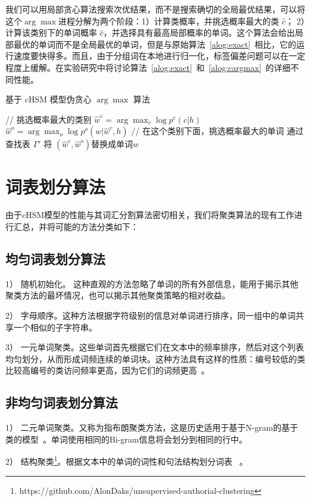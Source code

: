 我们可以用局部贪心算法搜索次优结果，而不是搜索确切的全局最优结果，可以将这个$\arg\max$进程分解为两个阶段：1）计算类概率，并挑选概率最大的类 $\hat c $； 2）计算该类别下的单词概率 $\hat c$，并选择具有最高局部概率的单词。这个算法会给出局部最优的单词而不是全局最优的单词，但是与原始算法~\ref{alog:exact}~相比，它的运行速度要快得多。而且，由于分组词在本地进行归一化，标签偏差问题可以在一定程度上缓解。在实验研究中将讨论算法~\ref{alog:exact}~和~\ref{alog:cargmax}~的详细不同性能。
\begin{algorithm}[!t]
 \caption{基于 cHSM 模型伪贪心 $\arg\max$ 算法}\label{alog:cargmax}
{// 挑选概率最大的类别}\;
 {$\hat w^c=\arg\max_c{\log p^c(c|h)}$ }\;
 {$\hat w^o=\arg\max_o{\log p^o(w|\hat w^c,h)}$}\;
 {// 在这个类别下面，挑选概率最大的单词}\;
 {通过查找表 $\Gamma'$ 将 $(\hat w^c,\hat w^o)$替换成单词$w$}\;
\end{algorithm}

\section{词表划分算法}
由于cHSM模型的性能与其词汇分割算法密切相关，我们将聚类算法的现有工作进行汇总，并将可能的方法分类如下：

\subsection{均匀词表划分算法}
1） 随机初始化。 这种直观的方法忽略了单词的所有外部信息，能用于揭示其他聚类方法的最坏情况，也可以揭示其他聚类策略的相对收益。

2） 字母顺序。这种方法根据字符级别的信息对单词进行排序，同一组中的单词共享一个相似的子字符串。


3） 一元单词聚类。这些单词首先根据它们在文本中的频率排序，然后对这个列表均匀划分，从而形成词频连续的单词块。这种方法具有这样的性质：编号较低的类比较高编号的类访问频率更高，因为它们的词频更高~。



\subsection{非均匀词表划分算法}
1） 二元单词聚类。又称为指布朗聚类方法，这是历史适用于基于N-gram的基于类的模型~。单词使用相同的Bi-gram信息将会划分到相同的行中。

2） 结构聚类\footnote{https://github.com/AlonDaks/unsupervised-authorial-clustering}。根据文本中的单词的词性和句法结构划分词表~ 。

